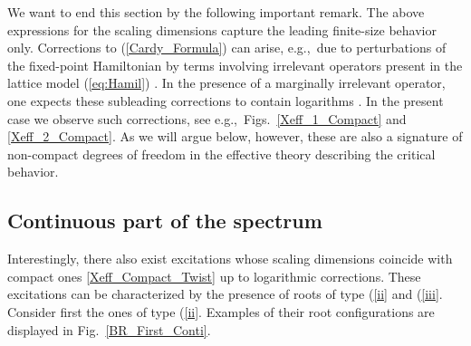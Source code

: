 \documentclass[12pt]{article}
\numberwithin{equation}{section}
\begin{document}
We want to end this section by the following important remark. The above expressions for the scaling dimensions capture the leading finite-size behavior only. Corrections to (\ref{Cardy_Formula}) can arise, e.g.,\ due to perturbations of the fixed-point Hamiltonian by terms involving irrelevant operators present in the lattice model (\ref{eq:Hamil}) \cite{Card86a}. In the presence of a marginally irrelevant operator, one expects these subleading corrections to contain logarithms \cite{Card86c}.  In the present case we observe such corrections, see e.g.,\ Figs.~\ref{Xeff_1_Compact} and \ref{Xeff_2_Compact}.  As we will argue below, however, these are also a signature of non-compact degrees of freedom in the effective theory describing the critical behavior.

\subsection{Continuous part of the spectrum}

Interestingly, there also exist excitations whose scaling dimensions coincide with compact ones \eqref{Xeff_Compact_Twist} up to logarithmic corrections. These excitations can be characterized by the presence of roots of type (\ref{ii} and (\ref{iii}. Consider first the ones of type (\ref{ii}. Examples of their root configurations are displayed in Fig.~\ref{BR_First_Conti}. 
\end{document}
